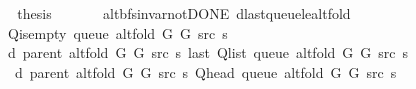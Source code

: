 \begin{isabellebody}
\ \ \isamarkupfalse%
\ \isamarkupfalse%
\ {\isacharquery}{\kern0pt}thesis\isanewline
\ \ \ \ \isacommand{{\isachardot}{\kern0pt}}\isamarkupfalse%
\isanewline
{}\isamarkupfalse%
%
\endisatagproof
{\isafoldproof}%
%
\isadelimproof
\isanewline
%
\endisadelimproof
\isanewline
{}\isamarkupfalse%
\ {\isacharparenleft}{\kern0pt}\ alt{\isacharunderscore}{\kern0pt}bfs{\isacharunderscore}{\kern0pt}invar{\isacharunderscore}{\kern0pt}not{\isacharunderscore}{\kern0pt}DONE{\isacharparenright}{\kern0pt}\ d{\isacharunderscore}{\kern0pt}last{\isacharunderscore}{\kern0pt}queue{\isacharunderscore}{\kern0pt}le{\isacharunderscore}{\kern0pt}alt{\isacharunderscore}{\kern0pt}fold{\isacharcolon}{\kern0pt}\isanewline
\ \ \ {\isachardoublequoteopen}{\isasymnot}\ Q{\isacharunderscore}{\kern0pt}is{\isacharunderscore}{\kern0pt}empty\ {\isacharparenleft}{\kern0pt}queue\ {\isacharparenleft}{\kern0pt}alt{\isacharunderscore}{\kern0pt}fold\ G{}\ G{}\ src\ s{\isacharparenright}{\kern0pt}{\isacharparenright}{\kern0pt}{\isachardoublequoteclose}\isanewline
\ \ \isanewline
\ \ \ \ {\isachardoublequoteopen}d\ {\isacharparenleft}{\kern0pt}parent\ {\isacharparenleft}{\kern0pt}alt{\isacharunderscore}{\kern0pt}fold\ G{}\ G{}\ src\ s{\isacharparenright}{\kern0pt}{\isacharparenright}{\kern0pt}\ {\isacharparenleft}{\kern0pt}last\ {\isacharparenleft}{\kern0pt}Q{\isacharunderscore}{\kern0pt}list\ {\isacharparenleft}{\kern0pt}queue\ {\isacharparenleft}{\kern0pt}alt{\isacharunderscore}{\kern0pt}fold\ G{}\ G{}\ src\ s{\isacharparenright}{\kern0pt}{\isacharparenright}{\kern0pt}{\isacharparenright}{\kern0pt}{\isacharparenright}{\kern0pt}\ {\isasymle}\isanewline
\ \ \ \ \ d\ {\isacharparenleft}{\kern0pt}parent\ {\isacharparenleft}{\kern0pt}alt{\isacharunderscore}{\kern0pt}fold\ G{}\ G{}\ src\ s{\isacharparenright}{\kern0pt}{\isacharparenright}{\kern0pt}\ {\isacharparenleft}{\kern0pt}Q{\isacharunderscore}{\kern0pt}head\ {\isacharparenleft}{\kern0pt}queue\ {\isacharparenleft}{\kern0pt}alt{\isacharunderscore}{\kern0pt}fold\ G{}\ G{}\ src\ s{\isacharparenright}{\kern0pt}{\isacharparenright}{\kern0pt}{\isacharparenright}{\kern0pt}\ {\isacharplus}{\kern0pt}\ {}{\isachardoublequoteclose}\isanewline
%
\isadelimproof
%
\endisadelimproof
%
\isatagproof
{}\isamarkupfalse%
\ {\isacharminus}{\kern0pt}\isanewline
\ \ \isamarkupfalse%

\end{isabellebody}
